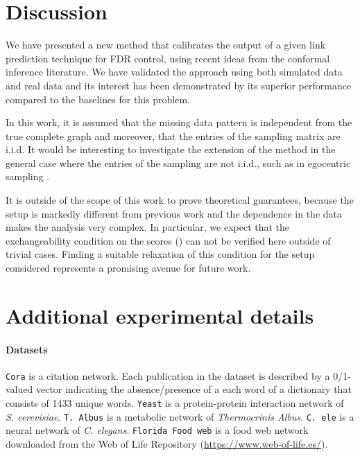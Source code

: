 \documentclass[a4paper, 11pt]{article}
\theoremstyle{remark}
\newcommand{\corange}[1]{\textcolor{orange}{#1}}
\begin{document}
\section{Discussion} \label{lp:sec:disc}

We have presented a new method that calibrates the output of a given link prediction technique for FDR control, using recent ideas from the conformal inference literature. We have validated the approach using both simulated data and real data and its interest has been demonstrated by its superior performance compared to the baselines for this problem. 

In this work, it is assumed that the missing data pattern is independent from the true complete graph and moreover, that the entries of the sampling matrix are i.i.d. It would be interesting to investigate the extension of the method in the general case where the entries of the sampling are not i.i.d., such as in egocentric sampling \citep{levina23}. 

It is outside of the scope of this work to prove theoretical guarantees, because the setup is markedly different from previous work and the dependence in the data makes the analysis very complex. In particular, we expect that the exchangeability condition on the scores (\cite{marandon22b}) can not be verified here outside of trivial cases. Finding a suitable relaxation of this condition for the setup considered represents a promising avenue for future work. 





\appendix 

\section{Additional experimental details} \label{lp:app:expdetails}

\paragraph{Datasets} 
 \texttt{Cora} \citep{dataset:cora} is a citation network. Each publication in the dataset is described by a 0/1-valued vector indicating the absence/presence of a each word of a dictionary that consists of 1433 unique words.
 \texttt{Yeast} \citep{dataset:yeast} is a protein-protein interaction network of \textit{S. cerevisiae}. %
 \texttt{T. Albus} \citep{weber21} is a metabolic network of \textit{Thermocrinis Albus}. %
 \texttt{C. ele} \citep{dataset:cele} is a neural network of \textit{C. elegans}. 
\texttt{Florida Food web}  \citep{foodweb99} is a food web network downloaded from the Web of Life Repository (\url{https://www.web-of-life.es/}).
 
\end{document}
